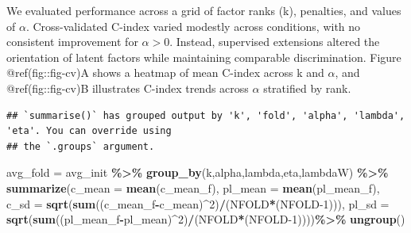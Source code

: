 \documentclass[
]{article}
\newenvironment{Shaded}{\begin{snugshade}}{\end{snugshade}}
\newcommand{\AttributeTok}[1]{\textcolor[rgb]{0.13,0.29,0.53}{#1}}
\newcommand{\DecValTok}[1]{\textcolor[rgb]{0.00,0.00,0.81}{#1}}
\newcommand{\FunctionTok}[1]{\textcolor[rgb]{0.13,0.29,0.53}{\textbf{#1}}}
\newcommand{\NormalTok}[1]{#1}
\newcommand{\OtherTok}[1]{\textcolor[rgb]{0.56,0.35,0.01}{#1}}
\newcommand{\SpecialCharTok}[1]{\textcolor[rgb]{0.81,0.36,0.00}{\textbf{#1}}}
\begin{document}
We evaluated performance across a grid of factor ranks (k), penalties,
and values of \(\alpha\). Cross-validated C-index varied modestly across
conditions, with no consistent improvement for \(\alpha>0\). Instead,
supervised extensions altered the orientation of latent factors while
maintaining comparable discrimination. Figure @ref(fig::fig-cv)A shows a
heatmap of mean C-index across k and \(\alpha\), and @ref(fig::fig-cv)B
illustrates C-index trends across \(\alpha\) stratified by rank.

\begin{Shaded}
\end{Shaded}

\begin{verbatim}
## `summarise()` has grouped output by 'k', 'fold', 'alpha', 'lambda', 'eta'. You can override using
## the `.groups` argument.
\end{verbatim}

\begin{Shaded}
\begin{Highlighting}[]
\NormalTok{avg\_fold }\OtherTok{=}\NormalTok{ avg\_init }\SpecialCharTok{\%\textgreater{}\%} \FunctionTok{group\_by}\NormalTok{(k,alpha,lambda,eta,lambdaW) }\SpecialCharTok{\%\textgreater{}\%}
  \FunctionTok{summarize}\NormalTok{(}\AttributeTok{c\_mean =} \FunctionTok{mean}\NormalTok{(c\_mean\_f), }\AttributeTok{pl\_mean =} \FunctionTok{mean}\NormalTok{(pl\_mean\_f),}
            \AttributeTok{c\_sd =} \FunctionTok{sqrt}\NormalTok{(}\FunctionTok{sum}\NormalTok{((c\_mean\_f}\SpecialCharTok{{-}}\NormalTok{c\_mean)}\SpecialCharTok{\^{}}\DecValTok{2}\NormalTok{)}\SpecialCharTok{/}\NormalTok{(NFOLD}\SpecialCharTok{*}\NormalTok{(NFOLD}\DecValTok{{-}1}\NormalTok{))), }
            \AttributeTok{pl\_sd =} \FunctionTok{sqrt}\NormalTok{(}\FunctionTok{sum}\NormalTok{((pl\_mean\_f}\SpecialCharTok{{-}}\NormalTok{pl\_mean)}\SpecialCharTok{\^{}}\DecValTok{2}\NormalTok{)}\SpecialCharTok{/}\NormalTok{(NFOLD}\SpecialCharTok{*}\NormalTok{(NFOLD}\DecValTok{{-}1}\NormalTok{))))}\SpecialCharTok{\%\textgreater{}\%}
  \FunctionTok{ungroup}\NormalTok{()}
\end{Highlighting}
\end{Shaded}
\end{document}
